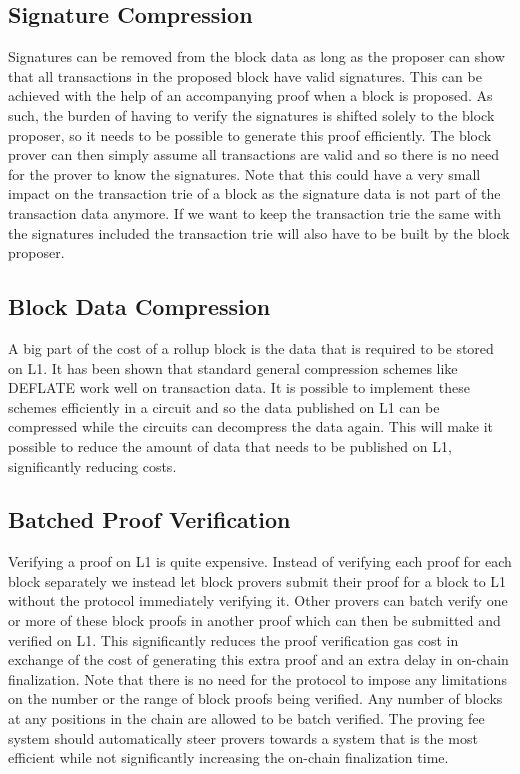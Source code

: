 \documentclass[9pt,oneside]{amsart}
\begin{document}
\begin{multicols}{2}
\subsection{Signature Compression}\label{sec:signature-opt}
Signatures can be removed from the block data as long as the proposer can show that all transactions in the proposed block have valid signatures. This can be achieved with the help of an accompanying proof when a block is proposed. As such, the burden of having to verify the signatures is shifted solely to the block proposer, so it needs to be possible to generate this proof efficiently. The block prover can then simply assume all transactions are valid and so there is no need for the prover to know the signatures. Note that this could have a very small impact on the transaction trie of a block as the signature data is not part of the transaction data anymore. If we want to keep the transaction trie the same with the signatures included the transaction trie will also have to be built by the block proposer.

\subsection{Block Data Compression}\label{sec:compression}
A big part of the cost of a rollup block is the data that is required to be stored on L1. It has been shown that standard general compression schemes like DEFLATE \cite{deflate} work well on transaction data. It is possible to implement these schemes efficiently in a circuit and so the data published on L1 can be compressed while the circuits can decompress the data again. This will make it possible to reduce the amount of data that needs to be published on L1, significantly reducing costs.

\subsection{Batched Proof Verification}\label{sec:proof-opt}
Verifying a proof on L1 is quite expensive. Instead of verifying each proof for each block separately we instead let block provers submit their proof for a block to L1 without the protocol immediately verifying it. Other provers can batch verify one or more of these block proofs in another proof which can then be submitted and verified on L1. This significantly reduces the proof verification gas cost in exchange of the cost of generating this extra proof and an extra delay in on-chain finalization. Note that there is no need for the protocol to impose any limitations on the number or the range of block proofs being verified. Any number of blocks at any positions in the chain are allowed to be batch verified. The proving fee system should automatically steer provers towards a system that is the most efficient while not significantly increasing the on-chain finalization time.


\end{multicols}
\end{document}
